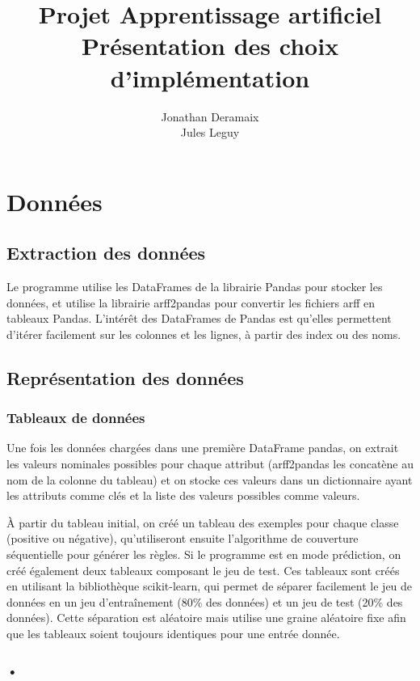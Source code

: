 \documentclass[]{article}
\title{Projet Apprentissage artificiel\\
Présentation des choix d'implémentation}
\author{Jonathan Deramaix\\
Jules Leguy}
\date{}
\begin{document}
\maketitle

\section{Données}

\subsection{Extraction des données}

\par Le programme utilise les DataFrames de la librairie Pandas pour stocker les données, et utilise la librairie arff2pandas pour convertir les fichiers arff en tableaux Pandas. L'intérêt des DataFrames de Pandas est qu'elles permettent d'itérer facilement sur les colonnes et les lignes, à partir des index ou des noms.

\subsection{Représentation des données}

\subsubsection{Tableaux de données}

\par Une fois les données chargées dans une première DataFrame pandas, on extrait les valeurs nominales possibles pour chaque attribut (arff2pandas les concatène au nom de la colonne du tableau) et on stocke ces valeurs dans un dictionnaire ayant les attributs comme clés et la liste des valeurs possibles comme valeurs.
\par À partir du tableau initial, on créé un tableau des exemples pour chaque classe (positive ou négative), qu'utiliseront ensuite l'algorithme de couverture séquentielle pour générer les règles. Si le programme est en mode prédiction, on créé également deux tableaux composant le jeu de test. Ces tableaux sont créés en utilisant la bibliothèque scikit-learn, qui permet de séparer facilement le jeu de données en un jeu d'entraînement (80\% des données) et un jeu de test (20\% des données). Cette séparation est aléatoire mais utilise une graine aléatoire fixe afin que les tableaux soient toujours identiques pour une entrée donnée.

\subsubsection{•}
\end{document}
